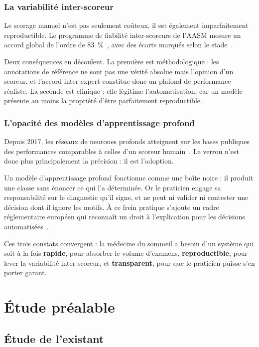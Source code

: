 \subsubsection{La variabilité inter-scoreur}

Le scorage manuel n'est pas seulement coûteux, il est également imparfaitement
reproductible. Le programme de fiabilité inter-scoreurs de l'AASM mesure un accord
global de l'ordre de \SI{83}{\percent}~\cite{rosenberg2013}, avec des écarts marqués
selon le stade~\cite{danker2009}.

Deux conséquences en découlent. La première est méthodologique : les annotations de
référence ne sont pas une vérité absolue mais l'opinion d'un scoreur, et l'accord
inter-expert constitue donc un plafond de performance réaliste. La seconde est
clinique : elle légitime l'automatisation, car un modèle présente au moins la propriété
d'être parfaitement reproductible.

\subsubsection{L'opacité des modèles d'apprentissage profond}

Depuis 2017, les réseaux de neurones profonds atteignent sur les bases publiques des
performances comparables à celles d'un scoreur humain~\cite{supratak2017,perslev2021}.
Le verrou n'est donc plus principalement la précision : il est l'adoption.

Un modèle d'apprentissage profond fonctionne comme une boîte noire : il produit une
classe sans énoncer ce qui l'a déterminée. Or le praticien engage sa responsabilité sur
le diagnostic qu'il signe, et ne peut ni valider ni contester une décision dont il
ignore les motifs. À ce frein pratique s'ajoute un cadre réglementaire européen qui
reconnaît un droit à l'explication pour les décisions automatisées~\cite{goodman2017}.

\medskip
\noindent
Ces trois constats convergent : la médecine du sommeil a besoin d'un système qui soit à
la fois \textbf{rapide}, pour absorber le volume d'examens, \textbf{reproductible},
pour lever la variabilité inter-scoreur, et \textbf{transparent}, pour que le praticien
puisse s'en porter garant.

\section{Étude préalable}

\subsection{Étude de l'existant}

